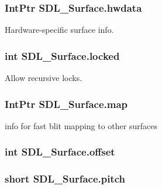 \hypertarget{struct_s_d_l___surface_a6da45c19f4069e7f3ff6b9a3a3eb1779}{
\subsubsection[{hwdata}]{\setlength{\rightskip}{0pt plus 5cm}IntPtr {\bf SDL\_\-Surface.hwdata}}}
\label{struct_s_d_l___surface_a6da45c19f4069e7f3ff6b9a3a3eb1779}


Hardware-\/specific surface info. 

\hypertarget{struct_s_d_l___surface_a7781fdb11c51fd860988f4f3467f6573}{
\subsubsection[{locked}]{\setlength{\rightskip}{0pt plus 5cm}int {\bf SDL\_\-Surface.locked}}}
\label{struct_s_d_l___surface_a7781fdb11c51fd860988f4f3467f6573}


Allow recursive locks. 

\hypertarget{struct_s_d_l___surface_a65e3b1ef2108b927d32f1261c9300f17}{
\subsubsection[{map}]{\setlength{\rightskip}{0pt plus 5cm}IntPtr {\bf SDL\_\-Surface.map}}}
\label{struct_s_d_l___surface_a65e3b1ef2108b927d32f1261c9300f17}


info for fast blit mapping to other surfaces 

\hypertarget{struct_s_d_l___surface_a6cfa15440f7eaa8b3eab829086e0e2e9}{
\subsubsection[{offset}]{\setlength{\rightskip}{0pt plus 5cm}int {\bf SDL\_\-Surface.offset}}}
\label{struct_s_d_l___surface_a6cfa15440f7eaa8b3eab829086e0e2e9}
\hypertarget{struct_s_d_l___surface_a5a49b2858d06c49d2bb95ad39a6c62d7}{
\subsubsection[{pitch}]{\setlength{\rightskip}{0pt plus 5cm}short {\bf SDL\_\-Surface.pitch}}}
\label{struct_s_d_l___surface_a5a49b2858d06c49d2bb95ad39a6c62d7}


